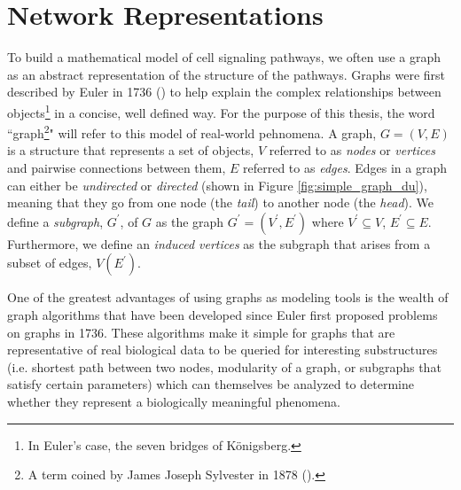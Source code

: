 \documentclass[12pt,twoside]{reedthesis}
\theoremstyle{definition}
\begin{document}
 \section{Network Representations}

  To build a mathematical model of cell signaling pathways, we often use a graph as an abstract representation of the structure of the pathways. Graphs were first described by Euler in 1736 (\cite{Shields2012}) to help explain the complex relationships between objects\footnote{In Euler's case, the seven bridges of K\"{o}nigsberg.} in a concise, well defined way. For the purpose of this thesis, the word ``graph\footnote{A term coined by James Joseph Sylvester in 1878 (\cite{Biggs1986}).}" will refer to this model of real-world pehnomena. A graph, $G=(V,E)$ is a structure that represents a set of objects, $V$ referred to as \textit{nodes} or \textit{vertices} and pairwise connections between them, $E$ referred to as \textit{edges}. Edges in a graph can either be \textit{undirected} or \textit{directed} (shown in Figure \ref{fig:simple_graph_du}), meaning that they go from one node (the \textit{tail}) to another node (the \textit{head}). We define a \textit{subgraph}, $G^\prime$, of $G$ as the graph $G^\prime=(V^\prime,E^\prime)$ where $V^\prime \subseteq V$, $E^\prime \subseteq E$. Furthermore, we define an \textit{induced vertices} as the subgraph that arises from a subset of edges, $V(E^\prime)$.\par

  One of the greatest advantages of using graphs as modeling tools is the wealth of graph algorithms that have been developed since Euler first proposed problems on graphs in 1736. These algorithms make it simple for graphs that are representative of real biological data to be queried for interesting substructures (i.e. shortest path between two nodes, modularity of a graph, or subgraphs that satisfy certain parameters) which can themselves be analyzed to determine whether they represent a biologically meaningful phenomena.\par
\end{document}
